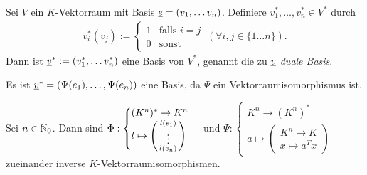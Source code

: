 \documentclass[../../main.tex]{subfiles}
\begin{document}
\begin{kordef}\label{13.1.5}
Sei $V$ ein $K$-Vektorraum mit Basis ${\underline e}=(v_1,\ldots v_n)$. Definiere $v_1^*,\ldots ,v_n^*\in V^*$ durch
\begin{align*}
v_i^*(v_j):=\begin{cases} 1 & \text{falls } i=j\\ 0 & \text{sonst}\end{cases}\ (\forall i,j\in \{1\ldots n\}).
\end{align*}
Dann ist ${\underline v}^*:=(v_1^*,\ldots v_n^*)$ eine Basis von $V^*$, genannt die zu ${\underline v}$ \emph{duale Basis}.
\end{kordef}	
\begin{cproof}
Es ist ${\underline v}^*=(\Psi(e_1),\ldots ,\Psi(e_n))$ eine Basis, da $\Psi$ ein Vektorraumisomorphismus ist.
\end{cproof}

\begin{kor}\label{13.1.6}
Sei $n\in \mathbb N_0$. Dann sind $\Phi: \begin{cases}(K^n)^*\to K^n\\l\mapsto \left(\begin{smallmatrix}l(e_1)\\\vdots\\l(e_n)\end{smallmatrix}\right)\end{cases}$ und $\Psi: \begin{cases}K^n\to (K^n)^*\\ a\mapsto\begin{pmatrix*}K^n\to K\\ x\mapsto a^Tx\end{pmatrix*}\end{cases}$ zueinander inverse $K$-Vektorraumisomorphismen.
\end{kor}
	
\end{document}
